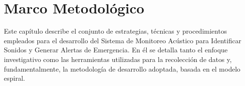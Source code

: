 \chapter{Marco Metodológico}

Este capítulo describe el conjunto de estrategias, técnicas y procedimientos empleados para el desarrollo del Sistema de Monitoreo Acústico para Identificar Sonidos y Generar Alertas de Emergencia. En él se detalla tanto el enfoque investigativo como las herramientas utilizadas para la recolección de datos y, fundamentalmente, la metodología de desarrollo adoptada, basada en el modelo espiral.






